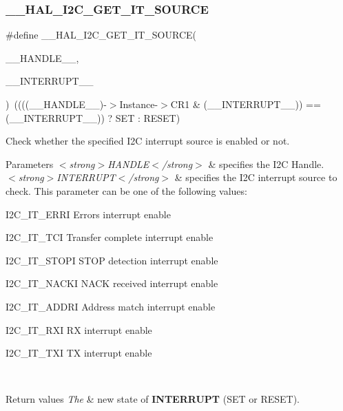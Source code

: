\subsubsection{\texorpdfstring{\_\_HAL\_I2C\_GET\_IT\_SOURCE}{\_\_HAL\_I2C\_GET\_IT\_SOURCE}}
{\footnotesize\ttfamily \#define \+\_\+\+\_\+\+H\+A\+L\+\_\+\+I2\+C\+\_\+\+G\+E\+T\+\_\+\+I\+T\+\_\+\+S\+O\+U\+R\+CE(\begin{DoxyParamCaption}\item[{}]{\+\_\+\+\_\+\+H\+A\+N\+D\+L\+E\+\_\+\+\_\+,  }\item[{}]{\+\_\+\+\_\+\+I\+N\+T\+E\+R\+R\+U\+P\+T\+\_\+\+\_\+ }\end{DoxyParamCaption})~((((\+\_\+\+\_\+\+H\+A\+N\+D\+L\+E\+\_\+\+\_\+)-\/$>$Instance-\/$>$C\+R1 \& (\+\_\+\+\_\+\+I\+N\+T\+E\+R\+R\+U\+P\+T\+\_\+\+\_\+)) == (\+\_\+\+\_\+\+I\+N\+T\+E\+R\+R\+U\+P\+T\+\_\+\+\_\+)) ? S\+ET \+: R\+E\+S\+ET)}



Check whether the specified I2C interrupt source is enabled or not. 


\begin{DoxyParams}{Parameters}
{\em $<$strong$>$\+H\+A\+N\+D\+L\+E$<$/strong$>$} & specifies the I2C Handle. \\
\hline
{\em $<$strong$>$\+I\+N\+T\+E\+R\+R\+U\+P\+T$<$/strong$>$} & specifies the I2C interrupt source to check. This parameter can be one of the following values\+: \begin{DoxyItemize}
\item I2\+C\+\_\+\+I\+T\+\_\+\+E\+R\+RI Errors interrupt enable \item I2\+C\+\_\+\+I\+T\+\_\+\+T\+CI Transfer complete interrupt enable \item I2\+C\+\_\+\+I\+T\+\_\+\+S\+T\+O\+PI S\+T\+OP detection interrupt enable \item I2\+C\+\_\+\+I\+T\+\_\+\+N\+A\+C\+KI N\+A\+CK received interrupt enable \item I2\+C\+\_\+\+I\+T\+\_\+\+A\+D\+D\+RI Address match interrupt enable \item I2\+C\+\_\+\+I\+T\+\_\+\+R\+XI RX interrupt enable \item I2\+C\+\_\+\+I\+T\+\_\+\+T\+XI TX interrupt enable\end{DoxyItemize}
\\
\hline
\end{DoxyParams}

\begin{DoxyRetVals}{Return values}
{\em The} & new state of {\bfseries{I\+N\+T\+E\+R\+R\+U\+PT}} (S\+ET or R\+E\+S\+ET). \\
\hline
\end{DoxyRetVals}
\mbox{\label{group___i2_c___exported___macros_ga74c8fd72a78882720c28448ce8bd33d8}} 
